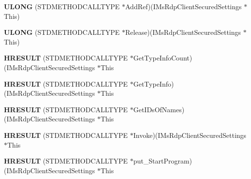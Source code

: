 \begin{DoxyCompactItemize}
{\bfseries U\+L\+O\+NG} (S\+T\+D\+M\+E\+T\+H\+O\+D\+C\+A\+L\+L\+T\+Y\+PE $\ast$Add\+Ref)(I\+Ms\+Rdp\+Client\+Secured\+Settings $\ast$This)
\item 
\mbox{\label{struct_i_ms_rdp_client_secured_settings_vtbl_a8cbebbf9dd7b3f0bfeae82fb8ec6cf0f}} 
{\bfseries U\+L\+O\+NG} (S\+T\+D\+M\+E\+T\+H\+O\+D\+C\+A\+L\+L\+T\+Y\+PE $\ast$Release)(I\+Ms\+Rdp\+Client\+Secured\+Settings $\ast$This)
\item 
\mbox{\label{struct_i_ms_rdp_client_secured_settings_vtbl_a44af3537f36c8eaa0b3db8f08cb6388c}} 
{\bfseries H\+R\+E\+S\+U\+LT} (S\+T\+D\+M\+E\+T\+H\+O\+D\+C\+A\+L\+L\+T\+Y\+PE $\ast$Get\+Type\+Info\+Count)(I\+Ms\+Rdp\+Client\+Secured\+Settings $\ast$This
\item 
\mbox{\label{struct_i_ms_rdp_client_secured_settings_vtbl_a0d45bf17bf27d67d550c11fcafdd2d6c}} 
{\bfseries H\+R\+E\+S\+U\+LT} (S\+T\+D\+M\+E\+T\+H\+O\+D\+C\+A\+L\+L\+T\+Y\+PE $\ast$Get\+Type\+Info)(I\+Ms\+Rdp\+Client\+Secured\+Settings $\ast$This
\item 
\mbox{\label{struct_i_ms_rdp_client_secured_settings_vtbl_a72090df872028ec362c2d94bf062d0ef}} 
{\bfseries H\+R\+E\+S\+U\+LT} (S\+T\+D\+M\+E\+T\+H\+O\+D\+C\+A\+L\+L\+T\+Y\+PE $\ast$Get\+I\+Ds\+Of\+Names)(I\+Ms\+Rdp\+Client\+Secured\+Settings $\ast$This
\item 
\mbox{\label{struct_i_ms_rdp_client_secured_settings_vtbl_a35b141e80f23ceef00772ae3d26f2065}} 
{\bfseries H\+R\+E\+S\+U\+LT} (S\+T\+D\+M\+E\+T\+H\+O\+D\+C\+A\+L\+L\+T\+Y\+PE $\ast$Invoke)(I\+Ms\+Rdp\+Client\+Secured\+Settings $\ast$This
\item 
\mbox{\label{struct_i_ms_rdp_client_secured_settings_vtbl_a3f97d27eaf23aac899346df39f82fe85}} 
{\bfseries H\+R\+E\+S\+U\+LT} (S\+T\+D\+M\+E\+T\+H\+O\+D\+C\+A\+L\+L\+T\+Y\+PE $\ast$put\+\_\+\+Start\+Program)(I\+Ms\+Rdp\+Client\+Secured\+Settings $\ast$This
\item 
\mbox{\label{struct_i_ms_rdp_client_secured_settings_vtbl_a1034bf1298ebdc1747bd9f7cc74c80a0}} 

\end{DoxyCompactItemize}
